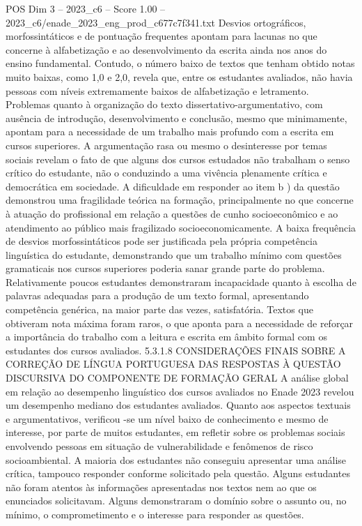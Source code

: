 \begin{textsample}{POS Dim 3 – 2023\_c6 – Score 1.00 – 2023\_c6/enade\_2023\_eng\_prod\_c677c7f341.txt}
Desvios ortográficos, morfossintáticos e de pontuação frequentes apontam para lacunas no que concerne à alfabetização e ao desenvolvimento da escrita ainda nos anos do ensino fundamental.
Contudo, o número baixo de textos que tenham obtido notas muito baixas, como 1,0 e 2,0, revela que, entre os estudantes avaliados, não havia pessoas com níveis extremamente baixos de alfabetização e letramento.
Problemas quanto à organização do texto dissertativo-argumentativo, com ausência de introdução, desenvolvimento e conclusão, mesmo que minimamente, apontam para a necessidade de um trabalho mais profundo com a escrita em cursos superiores.
A argumentação rasa ou mesmo o desinteresse por temas sociais revelam o fato de que alguns dos cursos estudados não trabalham o senso crítico do estudante, não o conduzindo a uma vivência plenamente crítica e democrática em sociedade.
A dificuldade em responder ao item b ) da questão demonstrou uma fragilidade teórica na formação, principalmente no que concerne à atuação do profissional em relação a questões de cunho socioeconômico e ao atendimento ao público mais fragilizado socioeconomicamente.
A baixa frequência de desvios morfossintáticos pode ser justificada pela própria competência linguística do estudante, demonstrando que um trabalho mínimo com questões gramaticais nos cursos superiores poderia sanar grande parte do problema.
Relativamente poucos estudantes demonstraram incapacidade quanto à escolha de palavras adequadas para a produção de um texto formal, apresentando competência genérica, na maior parte das vezes, satisfatória.
Textos que obtiveram nota máxima foram raros, o que aponta para a necessidade de reforçar a importância do trabalho com a leitura e escrita em âmbito formal com os estudantes dos cursos avaliados. 5.3.1.8 CONSIDERAÇÕES FINAIS SOBRE A CORREÇÃO DE LÍNGUA PORTUGUESA DAS RESPOSTAS À QUESTÃO DISCURSIVA DO COMPONENTE DE FORMAÇÃO GERAL A análise global em relação ao desempenho linguístico dos cursos avaliados no Enade 2023 revelou um desempenho mediano dos estudantes avaliados.
Quanto aos aspectos textuais e argumentativos, verificou -se um nível baixo de conhecimento e mesmo de interesse, por parte de muitos estudantes, em refletir sobre os problemas sociais envolvendo pessoas em situação de vulnerabilidade e fenômenos de risco socioambiental.
A maioria dos estudantes não conseguiu apresentar uma análise crítica, tampouco responder conforme solicitado pela questão.
Alguns estudantes não foram atentos às informações apresentadas nos textos nem ao que os enunciados solicitavam.
Alguns demonstraram o domínio sobre o assunto ou, no mínimo, o comprometimento e o interesse para responder as questões.

\end{textsample}
